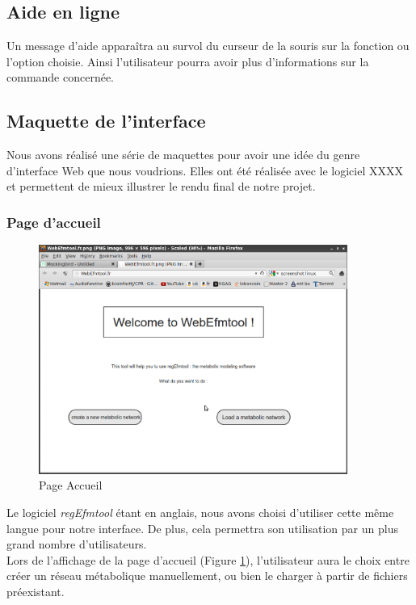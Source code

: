 \subsection{Aide en ligne}
Un message d'aide apparaîtra au survol du curseur de la souris sur la fonction ou l'option choisie. Ainsi l'utilisateur pourra avoir plus d'informations sur la commande concernée.

\subsection{Maquette de l'interface}
Nous avons réalisé une série de maquettes pour avoir une idée du genre d'interface Web que nous voudrions. Elles ont été réalisée avec le logiciel XXXX et permettent de mieux illustrer le rendu final de notre projet.


\subsubsection{Page d'accueil}

\begin{figure}[!ht]
	\begin{center}
  		\includegraphics[width=0.90\textwidth]{main.png}
  		\caption{Page Accueil}  
  		\label{main}
	\end{center}
\end{figure}

Le logiciel \textit{regEfmtool} étant en anglais, nous avons choisi d'utiliser cette même langue pour notre interface. De plus, cela permettra son utilisation par un plus grand nombre d'utilisateurs. \\
			Lors de l'affichage de la page d'accueil (Figure \ref{main}), l'utilisateur aura le choix entre créer un réseau métabolique manuellement, ou bien le charger à partir de fichiers préexistant. 
	
